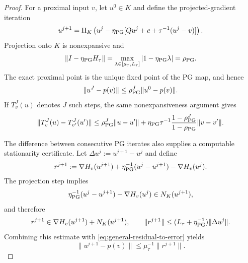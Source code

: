 \documentclass[letterpaper]{article} %
\theoremstyle{definition}
\theoremstyle{remark}
\begin{document}
\begin{proof}
For a proximal input $v$, let $u^0\in K$ and define the projected-gradient
iteration
\[
    u^{j+1}
    =
    \Pi_K\left(
        u^j-\eta_{\rm PG}
        [Qu^j+c+\tau^{-1}(u^j-v)]
    \right).
\]
Projection onto $K$ is nonexpansive and
\[
    \|I-\eta_{\rm PG}H_\tau\|
    =
    \max_{\lambda\in[\mu_\tau,L_\tau]}
    |1-\eta_{\rm PG}\lambda|
    =
    \rho_{\rm PG}.
\]
The exact proximal point is the unique fixed point of the PG map, and hence
\begin{equation}
\label{eq:theory-pg-contraction}
    \|u^J-p(v)\|
    \le
    \rho_{\rm PG}^J\|u^0-p(v)\|.
\end{equation}
If $T_v^J(u)$ denotes $J$ such steps, the same nonexpansiveness argument
gives
\begin{equation}
\label{eq:theory-pg-stability}
    \|T_v^J(u)-T_{v'}^J(u')\| \le \rho_{\rm PG}^J\|u-u'\| + \eta_{\rm PG}\tau^{-1} \frac{1-\rho_{\rm PG}^J}{1-\rho_{\rm PG}} \|v-v'\|.
\end{equation}

The difference between consecutive PG iterates also supplies a computable
stationarity certificate.  Let
$\Delta u^j:=u^{j+1}-u^j$ and define
\[
    r^{j+1}
    :=
    \nabla H_v(u^{j+1})
    +
    \eta_{\rm PG}^{-1}(u^j-u^{j+1})
    -
    \nabla H_v(u^j).
\]
The projection step implies
\[
    \eta_{\rm PG}^{-1}(u^j-u^{j+1})
    -
    \nabla H_v(u^j)
    \in
    N_K(u^{j+1}),
\]
and therefore
\begin{equation}
\label{eq:pg-step-to-stationarity}
    r^{j+1}
    \in
    \nabla H_v(u^{j+1})+N_K(u^{j+1}),
    \qquad
    \|r^{j+1}\|
    \le
    (L_\tau+\eta_{\rm PG}^{-1})\|\Delta u^j\|.
\end{equation}
Combining this estimate with
\eqref{eq:general-residual-to-error} yields
\[
    \|u^{j+1}-p(v)\|
    \le
    \mu_\tau^{-1}\|r^{j+1}\|.
\]


\end{proof}
\end{document}
